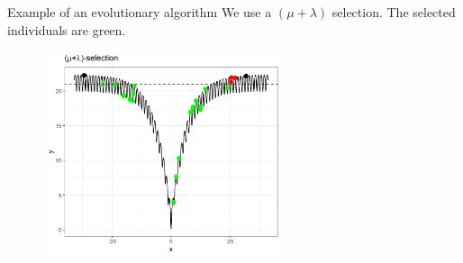 \documentclass[11pt,compress,t,notes=noshow, xcolor=table]{beamer}
\begin{document}
\begin{vbframe}{Example of an evolutionary algorithm}
We use a $(\mu + \lambda)$ selection. The selected individuals are green.

\vspace{0.5cm}

\begin{center}
\begin{figure}
  \includegraphics[height = 6cm, width = 7cm]{figure_man/selection.png}
\end{figure}
\end{center}


\end{vbframe}



\endlecture
\end{document}
